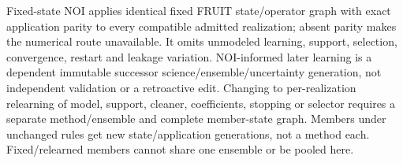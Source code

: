 {{Fixed-state NOI applies identical fixed FRUIT state/operator graph with exact
application parity to every compatible admitted realization; absent parity
makes the numerical route unavailable. It omits unmodeled learning, support,
selection, convergence, restart and leakage variation. NOI-informed later
learning is a dependent immutable successor science/ensemble/uncertainty
generation, not independent validation or a retroactive edit. Changing to
per-realization relearning of model, support, cleaner, coefficients, stopping
or selector requires a separate method/ensemble and complete member-state graph.
Members under unchanged rules get new state/application generations, not a
method each. Fixed/relearned members cannot share one ensemble or be pooled here.
}}
\newcommand{\PTCAppendix}{%
\pageunit{Frozen PTC application quotation}{app:ptc}{%
This is the byte-exact permitted SCI-PTC v0.1/r0.5 application fragment,
under the source-local notation cover in Appendix~\ref{app:notation}.
It supplies no numerical FRUIT cleaning, rank, metric, model or parent route.
FRUIT imports the distinction and restrictions, not a fresh PTC derivation.
\begin{quote}\small\end{quote}
\src{PTC\_APPLICATION\_REFERENCE.tex, exactly preserved; BOUNDARIES\_AND\_CONVENTIONS B2.}
}}
